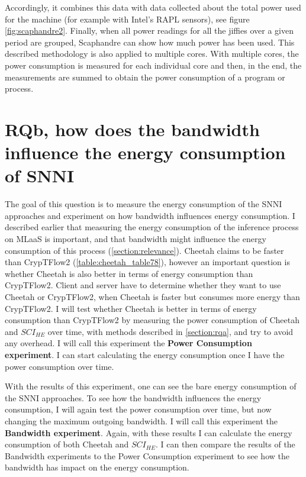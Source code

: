 \documentclass[../thesis.tex]{subfiles}
\begin{document}
Accordingly, it combines this data with data collected about the total power used for the machine (for example with Intel's RAPL sensors), see figure \ref{fig:scaphandre2}. Finally, when all power readings for all the jiffies over a given period are grouped, Scaphandre can show how much power has been used. This described methodology is also applied to multiple cores. With multiple cores, the power consumption is measured for each individual core and then, in the end, the measurements are summed to obtain the power consumption of a program or process.


\section{RQb, how does the bandwidth influence the energy consumption of SNNI}\label{section:rqb}
The goal of this question is to measure the energy consumption of the SNNI approaches and experiment on how bandwidth influences energy consumption. I described earlier that measuring the energy consumption of the inference process on MLaaS is important, and that bandwidth might influence the energy consumption of this process  (\autoref{section:relevance}). Cheetah claims to be faster than CrypTFlow2 (\autoref{table:cheetah_table78}), however an important question is whether Cheetah is also better in terms of energy consumption than CrypTFlow2. Client and server have to determine whether they want to use Cheetah or CrypTFlow2, when Cheetah is faster but consumes more energy than CrypTFlow2.  I will test whether Cheetah is better in terms of energy consumption than CrypTFlow2 by measuring the power consumption of Cheetah and $SCI_{HE}$ over time, with methods described in \autoref{section:rqa}, and try to avoid any overhead. I will call this experiment the \textbf{Power Consumption experiment}. I can start calculating the energy consumption once I have the power consumption over time.

With the results of this experiment, one can see the bare energy consumption of the SNNI approaches. To see how the bandwidth influences the energy consumption, I will again test the power consumption over time, but now changing the maximum outgoing bandwidth. I will call this experiment the \textbf{Bandwidth experiment}. Again, with these results I can calculate the energy consumption of both Cheetah and $SCI_{HE}$. I can then compare the results of the Bandwidth experiments to the Power Consumption experiment to see how the bandwidth has impact on the energy consumption.
\end{document}
